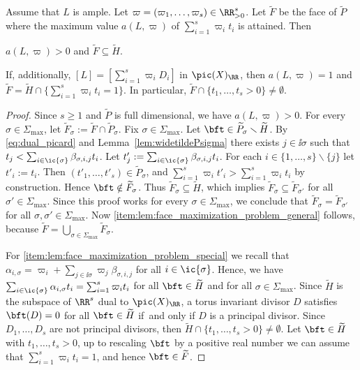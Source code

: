 \begin{lemma}
\label{lem:face_maximization_problem}
Assume that $L$ is ample. Let $\varpi=(\varpi_1,\dots,\varpi_s)\in\RR^s_{>0}$.
Let $\widetilde F$ be the face of $\widetilde P$ where the maximum value
$a(L,\varpi)$ of $\sum_{i=1}^s\varpi_i t_i$ is attained.
Then
\begin{enumeratei}
\item
\label{item:lem:face_maximization_problem_general}
$a(L,\varpi)>0$ and $\widetilde F\subseteq \widetilde H$.
\item
\label{item:lem:face_maximization_problem_special}
If, additionally, $[L]=[\sum_{i=1}^s\varpi_i D_i]$ in $\pic(X)_{\RR}$, then $a(L,\varpi)=1$
and $\widetilde F=\widetilde H \cap \{\sum_{i=1}^s\varpi_i t_i=1\}$.
In particular, $\widetilde F\cap \{t_1,\dots,t_s>0\}\neq\emptyset$.
\end{enumeratei}
\end{lemma}
\begin{proof}
Since $s\geq1$ and $\widetilde P$ is full dimensional, we have $a(L,\varpi)>0$.
For every $\sigma\in\Sigma_{\max}$, let
$\widetilde F_\sigma:= \widetilde F\cap \widetilde P_\sigma$.
Fix $\sigma\in\Sigma_{\max}$.
Let $\bft\in \widetilde P_\sigma \smallsetminus \widetilde H$.
By \eqref{eq:dual_picard} and Lemma~\ref{lem:widetildePsigma}
there exists $j\in\ii{\sigma}$ such that
$t_{j}<\sum_{i\in\ic{\sigma}}\beta_{\sigma,i,j} t_i$.
Let $t'_{j}:=\sum_{i\in\ic{\sigma}}\beta_{\sigma,i,j} t_i$.
For each $i\in\{1,\dots,s\}\smallsetminus\{j\}$ let $t'_i:=t_i$.
Then $(t'_{1},\dots,t'_{s}) \in \widetilde P_\sigma$, and
$\sum_{i=1}^s\varpi_i t'_i
> \sum_{i=1}^s\varpi_i t_i $ by construction.
Hence $\bft\notin \widetilde F_\sigma$.
Thus $\widetilde F_\sigma \subseteq \widetilde H$, which implies
$\widetilde F_{\sigma} \subseteq \widetilde F_{\sigma'}$ for all $\sigma'\in\Sigma_{\max}$.
Since this proof works for every $\sigma \in \Sigma_{\max}$, we conclude that
$\widetilde F_{\sigma} = \widetilde F_{\sigma'}$ for all $\sigma, \sigma'\in\Sigma_{\max}$.
Now \eqref{item:lem:face_maximization_problem_general} follows, because
$\widetilde F=\bigcup_{\sigma\in\Sigma_{\max}}\widetilde F_\sigma$.

For \eqref{item:lem:face_maximization_problem_special} we recall that
$\alpha_{i,\sigma}=\varpi_i+\sum_{j\in\ii{\sigma}}\varpi_j\beta_{\sigma,i,j}$
for all $i\in\ic{\sigma}$. Hence, we have
$\sum_{i\in\ic{\sigma}}\alpha_{i,\sigma}t_i=\sum_{i=1}^s\varpi_i t_i$
for all $\bft\in \widetilde H$ and for all $\sigma\in\Sigma_{\max}$.
Since $\widetilde H$ is the subspace of $\RR^s$ dual to $\pic(X)_{\RR}$,
a torus invariant divisor $D$ satisfies $\bft(D)=0$ for all $\bft\in\widetilde H$
if~and only if $D$ is a principal divisor. Since $D_1,\dots, D_s$ are not principal divisors, then
$\widetilde H \cap \{t_1,\dots,t_s>0\}\neq\emptyset$.
Let $\bft \in \widetilde H$ with $t_1,\dots,t_s>0$,
up to rescaling $\bft$ by a positive real number we can assume that
$\sum_{i=1}^s\varpi_i t_i=1$, and hence $\bft\in\widetilde F$.
\end{proof}

